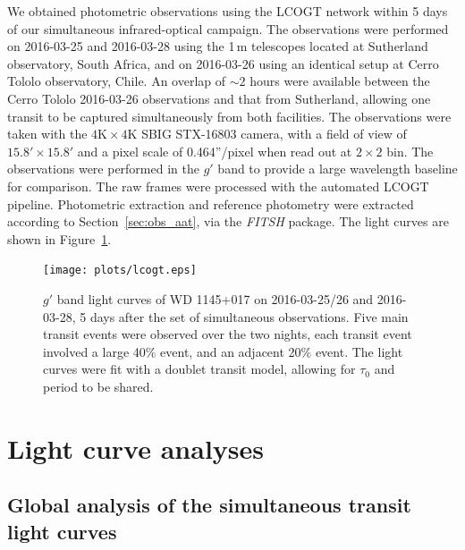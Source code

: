 \documentclass[apj]{emulateapj}
\begin{document}
We obtained photometric observations using the LCOGT network within 5 days of our simultaneous infrared-optical campaign. The observations were performed on 2016-03-25 and 2016-03-28 using the 1\,m telescopes located at Sutherland observatory, South Africa, and on 2016-03-26 using an identical setup at Cerro Tololo observatory, Chile. An overlap of $\sim 2$ hours were available between the Cerro Tololo 2016-03-26 observations and that from Sutherland, allowing one transit to be captured simultaneously from both facilities. The observations were taken with the $4\mathrm{K} \times 4 \mathrm{K}$ SBIG STX-16803 camera, with a field of view of $15.8'\times 15.8'$ and a pixel scale of 0.464''/pixel when read out at $2\times 2$ bin. The observations were performed in the $g'$ band to provide a large wavelength baseline for comparison. The raw frames were processed with the automated LCOGT pipeline. Photometric extraction and reference photometry were extracted according to Section~\ref{sec:obs_aat}, via the \emph{FITSH} package. The light curves are shown in Figure~\ref{fig:lcogt}.

\begin{figure}
    \vspace{5mm}
    \centering
    \texttt{[image: plots/lcogt.eps]}
    \caption{$g'$ band light curves of WD 1145+017 on 2016-03-25/26 and 2016-03-28, 5 days after the set of simultaneous observations. Five main transit events were observed over the two nights, each transit event involved a large 40\% event, and an adjacent 20\% event. The light curves were fit with a doublet transit model, allowing for $\tau_0$ and period to be shared.}
    \label{fig:lcogt}
\end{figure}



\section{Light curve analyses}
\label{sec:lightcurve_model}

\subsection{Global analysis of the simultaneous transit light curves}
\label{sec:simultaneous_lc}
\end{document}
